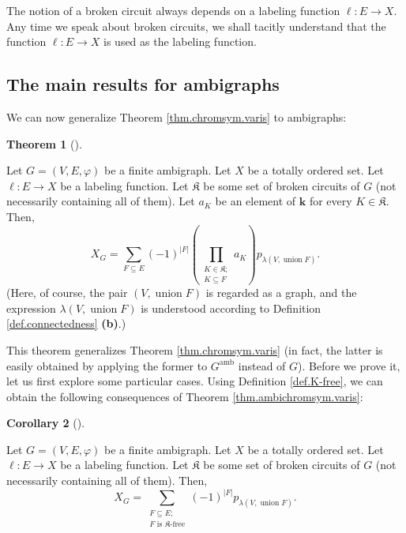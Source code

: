 \documentclass[numbers=enddot,12pt,final,onecolumn,notitlepage]{scrartcl}%
\theoremstyle{definition}
\newtheorem{theo}{Theorem}[section]
\newenvironment{theorem}[1][]
{\begin{theo}[#1]\begin{leftbar}}
{\end{leftbar}\end{theo}}
\newtheorem{coro}[theo]{Corollary}
\newenvironment{corollary}[1][]
{\begin{coro}[#1]\begin{leftbar}}
{\end{leftbar}\end{coro}}
\let\sumnonlimits\sum
\let\prodnonlimits\prod
\renewcommand{\sum}{\sumnonlimits\limits}
\renewcommand{\prod}{\prodnonlimits\limits}
\begin{document}
The notion of a broken circuit always depends on a labeling function
$\ell:E\rightarrow X$. Any time we speak about broken circuits, we shall
tacitly understand that the function $\ell:E\rightarrow X$ is used as the
labeling function.

\subsection{The main results for ambigraphs}

We can now generalize Theorem \ref{thm.chromsym.varis} to ambigraphs:

\begin{theorem}
\label{thm.ambichromsym.varis}Let $G=\left(  V,E,\varphi\right)  $ be a finite
ambigraph. Let $X$ be a totally ordered set. Let $\ell:E\rightarrow X$ be a
labeling function. Let $\mathfrak{K}$ be some set of broken circuits of $G$
(not necessarily containing all of them). Let $a_{K}$ be an element of
$\mathbf{k}$ for every $K\in\mathfrak{K}$. Then,%
\[
X_{G}=\sum_{F\subseteq E}\left(  -1\right)  ^{\left\vert F\right\vert }\left(
\prod_{\substack{K\in\mathfrak{K};\\K\subseteq F}}a_{K}\right)  p_{\lambda
\left(  V,\operatorname*{union}F\right)  }.
\]
(Here, of course, the pair $\left(  V,\operatorname*{union}F\right)  $ is
regarded as a graph, and the expression $\lambda\left(
V,\operatorname*{union}F\right)  $ is understood according to Definition
\ref{def.connectedness} \textbf{(b)}.)
\end{theorem}

This theorem generalizes Theorem \ref{thm.chromsym.varis} (in fact, the latter
is easily obtained by applying the former to $G^{\operatorname*{amb}}$ instead
of $G$). Before we prove it, let us first explore some particular cases. Using
Definition \ref{def.K-free}, we can obtain the following consequences of
Theorem \ref{thm.ambichromsym.varis}:

\begin{corollary}
\label{cor.ambichromsym.K-free}Let $G=\left(  V,E,\varphi\right)  $ be a
finite ambigraph. Let $X$ be a totally ordered set. Let $\ell:E\rightarrow X$
be a labeling function. Let $\mathfrak{K}$ be some set of broken circuits of
$G$ (not necessarily containing all of them). Then,%
\[
X_{G}=\sum_{\substack{F\subseteq E;\\F\text{ is }\mathfrak{K}\text{-free}%
}}\left(  -1\right)  ^{\left\vert F\right\vert }p_{\lambda\left(
V,\operatorname*{union}F\right)  }.
\]

\end{corollary}
\end{document}
